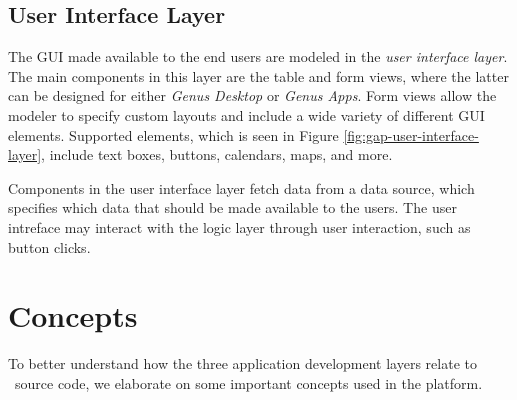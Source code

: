 
\subsection{User Interface Layer}
\label{sub:User Interface Layer}

The GUI made available to the end users are modeled in the \textit{user interface layer}. The main components in this layer are the table and form views, where the latter can be designed for either \textit{Genus Desktop} or \textit{Genus Apps}. Form views allow the modeler to specify custom layouts and include a wide variety of different GUI elements. Supported elements, which is seen in Figure \ref{fig:gap-user-interface-layer}, include text boxes, buttons, calendars, maps, and more.

Components in the user interface layer fetch data from a data source, which specifies which data that should be made available to the users. The user intreface may interact with the logic layer through user interaction, such as button clicks.

\section{Concepts}
\label{sec:Concepts}
To better understand how the three application development layers relate to \gap~source code, we elaborate on some important concepts used in the platform.

